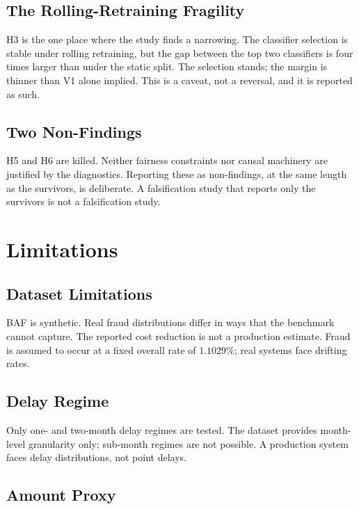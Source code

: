 \documentclass[conference]{IEEEtran}
\begin{document}
\subsection{The Rolling-Retraining Fragility}

H3 is the one place where the study finds a narrowing. The classifier
selection is stable under rolling retraining, but the gap between the top
two classifiers is four times larger than under the static split. The
selection stands; the margin is thinner than V1 alone implied. This is a
caveat, not a reversal, and it is reported as such.

\subsection{Two Non-Findings}

H5 and H6 are killed. Neither fairness constraints nor causal machinery are
justified by the diagnostics. Reporting these as non-findings, at the same
length as the survivors, is deliberate. A falsification study that reports
only the survivors is not a falsification study.

\section{Limitations}
\label{sec:lim}

\subsection{Dataset Limitations}

BAF is synthetic. Real fraud distributions differ in ways that the
benchmark cannot capture. The reported cost reduction is not a production
estimate. Fraud is assumed to occur at a fixed overall rate of $1.1029\%$;
real systems face drifting rates.

\subsection{Delay Regime}

Only one- and two-month delay regimes are tested. The dataset provides
month-level granularity only; sub-month regimes are not possible. A
production system faces delay distributions, not point delays.

\subsection{Amount Proxy}
\end{document}
